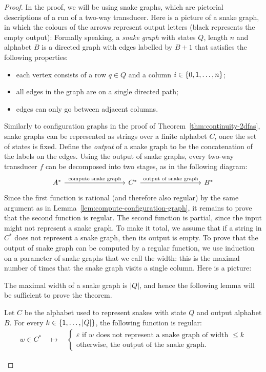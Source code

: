 \begin{proof}
    In the proof, we will be using snake graphs, which are pictorial descriptions of a run of a two-way transducer. Here is a picture of a snake graph, in which the colours of the arrows represent output letters (black represents the empty output):
    Formally speaking,  a \emph{snake graph} with states $Q$, length $n$ and alphabet $B$ is a directed graph with edges labelled by $B+1$  that satisfies the following properties:
    \begin{itemize}
        \item each vertex consists of a row $q \in Q$ and a column $i \in \{0,1,\ldots,n\}$;
        \item all edges in the graph are on a single directed path;
        \item edges can only go between adjacent columns.
    \end{itemize}
 Similarly to configuration graphs in the proof of Theorem~\ref{thm:continuity-2dfas}, snake graphs can be represented as strings over a finite alphabet $C$, once the set of states is fixed.     Define the \emph{output} of a snake graph to be the concatenation of the labels on the edges. Using the output of snake graphs, every two-way transducer $f$ can be decomposed into two stages, as in the following diagram:  \[
    \begin{tikzcd}[column sep=3cm]
    A^* \ar[r,"\text{compute snake graph}"] &
    C^* \ar[r,"\text{output of snake graph}"] & 
    B^*
    \end{tikzcd}
    \]
Since the first function is rational (and therefore also regular) by the same argument as in Lemma~\ref{lem:compute-configuration-graph}, it remains to prove that the second function is regular. 
    The second  function  is partial, since the input might not represent a snake graph. To make it total, we assume that if a string in $C^*$ does not represent a snake graph, then its output is empty. To prove that the output of snake graph can be computed by a regular function, we use induction on  a parameter of snake graphs that we call the width: this is the maximal number of times that the snake graph visits a single column. Here is a picture:

The maximal width of a snake graph is $|Q|$, and hence the following lemma will be sufficient to prove the theorem. 
\begin{lemma}\label{lem:output-of-snake-graph-is-regular}
    Let $C$ be the alphabet used to represent snakes with state $Q$ and output alphabet $B$. For every $k \in \{1,\ldots,|Q|\}$, the following function is regular:
    \begin{align*}
    w \in C^* \quad \mapsto \quad 
    \begin{cases}
        \text{$\varepsilon$ if $w$ does not represent a snake graph of width $\le k$}\\
        \text{otherwise, the output of the snake graph.}
    \end{cases}
    \end{align*}
\end{lemma}


\end{proof}
